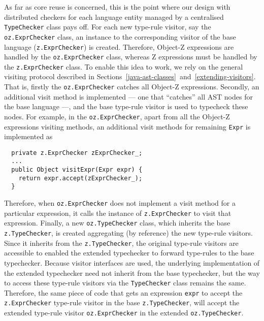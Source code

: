 \documentclass{llncs}
\begin{document}
As far as core reuse is concerned, this is the point where our design
with distributed checkers for each language entity managed by a
centralised {\tt TypeChecker} class pays off.
For each new type-rule visitor, say the {\tt oz.ExprChecker} class, an
instance to the corresponding visitor of the base language
({\tt z.ExprChecker}) is created. Therefore, Object-Z expressions are
handled by the {\tt oz.ExprChecker} class, whereas Z expressions must
be handled by the {\tt z.ExprChecker} class.
To enable this idea to work, we rely on the general visiting protocol
described in Sections~\ref{java-ast-classes}~and~\ref{extending-visitors}.
That is, firstly the {\tt oz.ExprChecker} catches all Object-Z expressions.
Secondly, an additional visit method is implemented --- one that ``catches'' all
AST nodes for the base language ---, and the base type-rule visitor is used to
typecheck these nodes.
For example, in the {\tt oz.ExprChecker}, apart from all the Object-Z expressions
visiting methods, an additional visit methods for remaining {\tt Expr} is implemented as
%
\begin{verbatim}
  private z.ExprChecker zExprChecker_;
  ...
  public Object visitExpr(Expr expr) {
    return expr.accept(zExprChecker_);
  }
\end{verbatim}
%
Therefore, when {\tt oz.ExprChecker} does not implement a visit method for
a particular expression, it calls the instance of {\tt z.ExprChecker} to visit
that expression.
Finally, a new {\tt oz.TypeChecker} class, which inherits the base {\tt z.TypeChecker},
is created aggregating (by reference) the new type-rule visitors.
Since it inherits from the {\tt z.TypeChecker}, the original type-rule visitors
are accessible to enabled the extended typechecker to forward type-rules to the base typechecker.
Because visitor interfaces are used, the underlying implementation of the extended typechecker
need not inherit from the base typechecker, but the way to access these type-rule visitors via
the {\tt TypeChecker} class remains the same.
Therefore, the same piece of code that gets an expression {\tt expr} to accept the {\tt z.ExprChecker}
type-rule visitor in the base {\tt z.TypeChecker}, will accept the extended type-rule visitor
{\tt oz.ExprChecker} in the extended {\tt oz.TypeChecker}.
\end{document}
